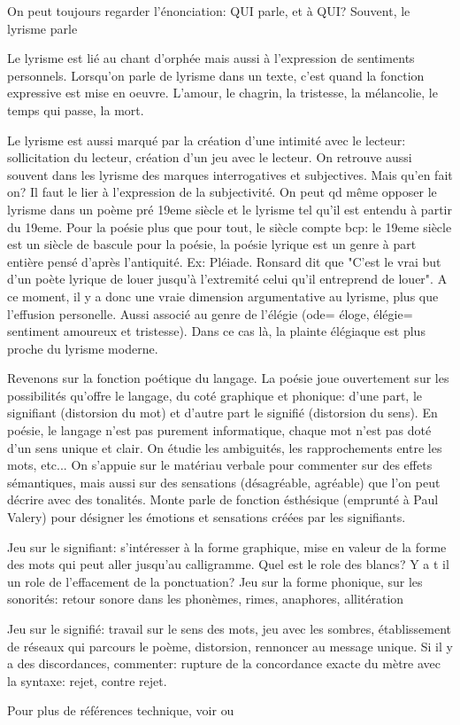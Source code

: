\documentclass[a4paper]{report}
\theoremstyle{definition}
\theoremstyle{remark}
\begin{document}
On peut toujours regarder l'énonciation: QUI parle, et à QUI? Souvent, le lyrisme parle\par \medskip 

Le lyrisme est lié au chant d'orphée mais aussi à l'expression de sentiments personnels. Lorsqu'on parle de lyrisme dans un texte, c'est quand la fonction expressive est mise en oeuvre. L'amour, le chagrin, la tristesse, la mélancolie, le temps qui passe, la mort. \par \medskip 

Le lyrisme est aussi marqué par la création d'une intimité avec le lecteur: sollicitation du lecteur, création d'un jeu avec le lecteur. On retrouve aussi souvent dans les lyrisme des marques interrogatives et subjectives. Mais qu'en fait on? Il faut le lier à l'expression de la subjectivité. On peut qd même opposer le lyrisme dans un poème pré 19eme siècle et le lyrisme tel qu'il est entendu à partir du 19eme. Pour la poésie plus que pour tout, le siècle compte bcp: le 19eme siècle est un siècle de bascule pour la poésie, la poésie lyrique est un genre à part entière pensé d'après l'antiquité. Ex: Pléiade. Ronsard dit que "C'est le vrai but d'un poète lyrique de louer jusqu'à l'extremité celui qu'il entreprend de louer". A ce moment, il y a donc une vraie dimension argumentative au lyrisme, plus que l'effusion personelle. Aussi associé au genre de l'élégie (ode= éloge, élégie= sentiment amoureux et tristesse). Dans ce cas là, la plainte élégiaque est plus proche du lyrisme moderne. \par \bigskip 

Revenons sur la fonction poétique du langage. La poésie joue ouvertement sur les possibilités qu'offre le langage, du coté graphique et phonique: d'une part, le signifiant (distorsion du mot) et d'autre part le signifié (distorsion du sens). En poésie, le langage n'est pas purement informatique, chaque mot n'est pas doté d'un sens unique et clair. On étudie les ambiguités, les rapprochements entre les mots, etc... On s'appuie sur le matériau verbale pour commenter sur des effets sémantiques, mais aussi sur des sensations (désagréable, agréable) que l'on peut décrire avec des tonalités. Monte parle de fonction ésthésique (emprunté à Paul Valery) pour désigner les émotions et sensations créées par les signifiants. \par \medskip 
Jeu sur le signifiant: s'intéresser à la forme graphique, mise en valeur de la forme des mots qui peut aller jusqu'au calligramme. Quel est le role des blancs? Y a t il un role de l'effacement de la ponctuation? Jeu sur la forme phonique, sur les sonorités: retour sonore dans les phonèmes, rimes, anaphores, allitération\par \smallskip 
Jeu sur le signifié: travail sur le sens des mots, jeu avec les sombres, établissement de réseaux qui parcours le poème, distorsion, rennoncer au message unique. Si il y a des discordances, commenter: rupture de la concordance exacte du mètre avec la syntaxe: rejet, contre rejet. \par \medskip 

Pour plus de références technique, voir \cite{ver1} ou \cite{ver2}

\printbibliography
\end{document}
